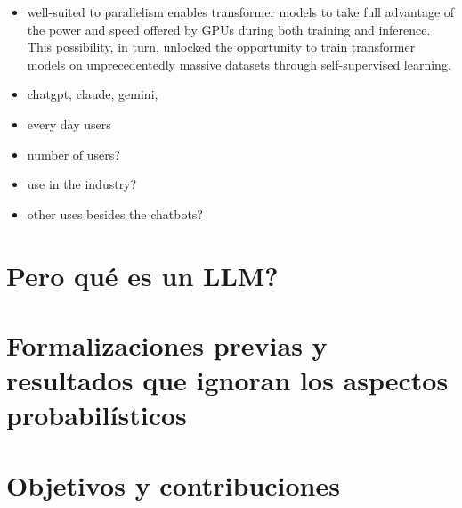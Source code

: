 \begin{itemize}
    \item well-suited to parallelism enables transformer models to take full advantage of the power and speed offered by GPUs during both training and inference. This possibility, in turn, unlocked the opportunity to train transformer models on unprecedentedly massive datasets through self-supervised learning.
    \item chatgpt, claude, gemini, 
    \item every day users
        \item number of users?
    \item use in the industry?
    \item other uses besides the chatbots?
\end{itemize}












\section{Pero qué es un LLM?}


\section{Formalizaciones previas y resultados que ignoran los aspectos probabilísticos}


\section{Objetivos y contribuciones}


